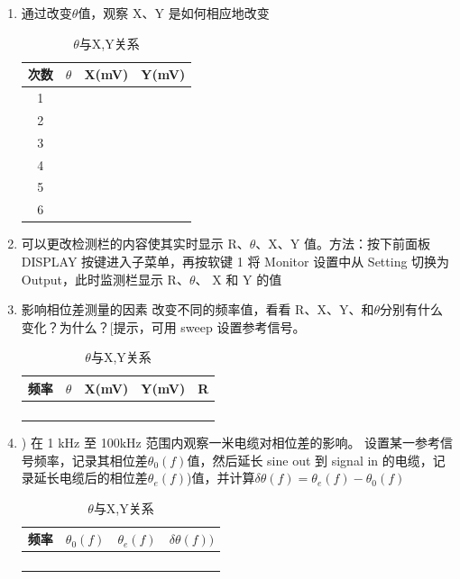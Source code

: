 \documentclass[11pt,a4paper]{ctexart}
\begin{document}
\begin{enumerate}[(1)]
		\item 通过改变$\theta$值，观察 X、Y 是如何相应地改变
		\begin{table}[H]
			\centering
			\caption{$\theta$与X,Y关系}
			\begin{tabular}{| c | p{2cm} | p{2cm} | p{2cm} |}
				\hline
				次数 & $\theta$ & X(mV) & Y(mV) \\
				\hline
				1 &  &  &  \\
				\hline
				2 &  &  &  \\
				\hline
				3 &  &  &  \\
				\hline
				4 &  &  &  \\
				\hline
				5 &  &  &  \\
				\hline
				6 &  &  &  \\
				\hline
			\end{tabular}
		\end{table}
		
		\item 可以更改检测栏的内容使其实时显示 R、$\theta$、X、Y 值。方法：按下前面板 DISPLAY 按键进入子菜单，再按软键 1 将 Monitor 设置中从 Setting 切换为 Output，此时监测栏显示 R、$\theta$、 X 和 Y 的值
		
		\item 影响相位差测量的因素
		改变不同的频率值，看看 R、X、Y、和$\theta$分别有什么变化？为什么？[提示，可用 sweep 设置参考信号。
		\begin{table}[H]
			\centering
			\caption{$\theta$与X,Y关系}
			\begin{tabular}{|  p{2cm} | p{2cm} | p{2cm} | p{2cm} | p{2cm} |}
				\hline
				频率 & $\theta$ & X(mV) & Y(mV) & R \\
				\hline
				 &  &  &  & \\
				\hline
				 &  &  &  & \\
				\hline
				 &  &  &  & \\
				\hline
				 &  &  &  & \\
				\hline

			\end{tabular}
		\end{table}
		
		
		\item ) 在 1 kHz 至 100kHz 范围内观察一米电缆对相位差的影响。
		设置某一参考信号频率，记录其相位差$\theta_0(f)$值，然后延长
		sine out 到 signal in 的电缆，记录延长电缆后的相位差$\theta_e(f)$)值，并计算$\delta\theta(f)=\theta_e(f)-\theta_0(f)$
		\begin{table}[H]
			\centering
			\caption{$\theta$与X,Y关系}
			\begin{tabular}{|  p{2cm} | p{2cm} | p{2cm} | p{2cm} |}
				\hline
				频率 & $\theta_0(f)$ & $\theta_e(f)$ & $\delta\theta(f))$ \\
				\hline
				&  &  &   \\
				\hline
				&  &  &   \\
				\hline
				&  &  &   \\
				\hline
				&  &  &   \\
				\hline
				

\end{tabular}
\end{table}
\end{enumerate}
\end{document}
